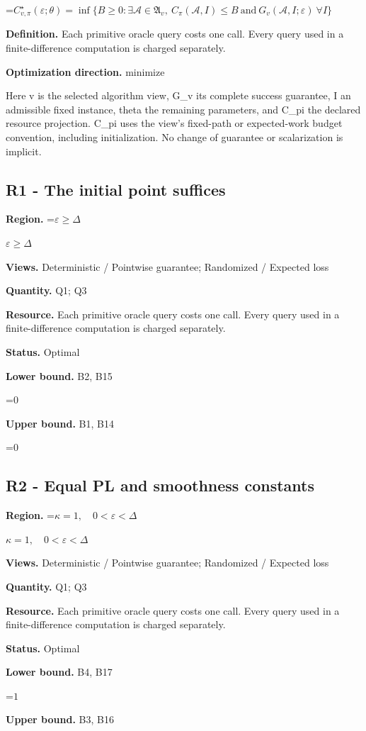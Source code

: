 \documentclass[10pt,a4paper]{article}
\newcommand{\AtlasMath}[1]{\par\begingroup\centering\setbox0=\hbox{$\displaystyle #1$}\ifdim\wd0>1.4\linewidth\typeout{ATLAS WIDE FORMULA: \the\wd0}\fi\ifdim\wd0>\linewidth\resizebox{\linewidth}{!}{\box0}\else\box0\fi\par\endgroup}
\newcommand{\AtlasInlineMath}[1]{\begingroup\setbox0=\hbox{$#1$}\ifdim\wd0>.4\linewidth\endgroup\AtlasMath{#1}\else\endgroup$#1$\fi}
\begin{document}
\AtlasMath{C^\star_{v,\pi}(\varepsilon;\theta)=\inf\{B\ge0:\exists\mathcal A\in\mathfrak A_v,\ C_\pi(\mathcal A,I)\le B\ \text{and}\ G_v(\mathcal A,I;\varepsilon)\ \forall I\}}
\textbf{Definition.} Each primitive oracle query costs one call. Every query used in a finite-difference computation is charged separately.

\textbf{Optimization direction.} minimize

Here v is the selected algorithm view, G\_v its complete success guarantee, I an admissible fixed instance, theta the remaining parameters, and C\_pi the declared resource projection. C\_pi uses the view's fixed-path or expected-work budget convention, including initialization. No change of guarantee or scalarization is implicit.

\subsection{R1 - The initial point suffices}
\textbf{Region.} \AtlasInlineMath{\varepsilon\ge\Delta}

\textbf{Views.} Deterministic / Pointwise guarantee; Randomized / Expected loss

\textbf{Quantity.} Q1; Q3

\textbf{Resource.} Each primitive oracle query costs one call. Every query used in a finite-difference computation is charged separately.

\textbf{Status.} Optimal

\textbf{Lower bound.} B2, B15

\AtlasMath{0}
\textbf{Upper bound.} B1, B14

\AtlasMath{0}
\subsection{R2 - Equal PL and smoothness constants}
\textbf{Region.} \AtlasInlineMath{\kappa=1,\quad0<\varepsilon<\Delta}

\textbf{Views.} Deterministic / Pointwise guarantee; Randomized / Expected loss

\textbf{Quantity.} Q1; Q3

\textbf{Resource.} Each primitive oracle query costs one call. Every query used in a finite-difference computation is charged separately.

\textbf{Status.} Optimal

\textbf{Lower bound.} B4, B17

\AtlasMath{1}
\textbf{Upper bound.} B3, B16
\end{document}
